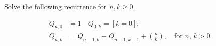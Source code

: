 \documentclass{article}
\begin{document}
	Solve the following recurrence for $n, k\geq 0$.
	
	\begin{align*}
		Q_{n, 0} &= 1 \quad Q_{0, k} = [k = 0]; \\
		Q_{n, k} &= Q_{n-1, k} + Q_{n-1, k-1} + \binom{n}{k}, \quad\text{for $n$, $k>0$.}
	\end{align*}
\end{document}
